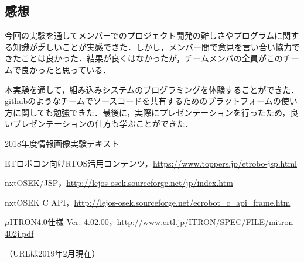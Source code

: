 \begin{multicols*}{2}
\section{感想}%
今回の実験を通してメンバーでのプロジェクト開発の難しさやプログラムに関する知識が乏しいことが実感できた．しかし，メンバー間で意見を言い合い協力できたことは良かった．結果が良くはなかったが，チームメンバの全員がこのチームで良かったと思っている．

本実験を通して，組み込みシステムのプログラミングを体験することができた．githubのようなチームでソースコードを共有するためのプラットフォームの使い方に関しても勉強できた．最後に，実際にプレゼンテーションを行ったため，良いプレゼンテーションの仕方も学ぶことができた．

\begin{thebibliography}{9}

2018年度情報画像実験テキスト

ETロボコン向けRTOS活用コンテンツ，\url{https://www.toppers.jp/etrobo-jsp.html}

nxtOSEK/JSP，\url{http://lejos-osek.sourceforge.net/jp/index.htm}

nxtOSEK C API，\url{http://lejos-osek.sourceforge.net/ecrobot_c_api_frame.htm}

$\mu$ITRON4.0仕様 Ver. 4.02.00，\url{http://www.ertl.jp/ITRON/SPEC/FILE/mitron-402j.pdf}

\end{thebibliography}
\noindent （URLは2019年2月現在）
\end{multicols*}

